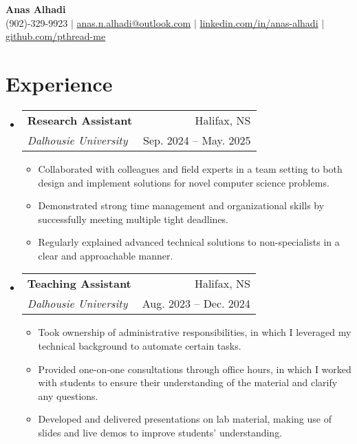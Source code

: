 \documentclass[letterpaper,11pt]{article}
\makeatletter
\newcommand{\resumeItem}[1]{
  \item\small{
    {#1 \vspace{-2pt}}
  }
}
\newcommand{\resumeSubheading}[4]{
  \vspace{-2pt}\item
    \begin{tabular*}{0.97\textwidth}[t]{l@{\extracolsep{\fill}}r}
      \textbf{#1} & #2 \\
			\textit{\small#3} & \small #4 \\
    \end{tabular*}\vspace{-7pt}
}
\newcommand{\resumeSubHeadingListStart}{\begin{itemize}[leftmargin=0.15in, label={}]}
\newcommand{\resumeSubHeadingListEnd}{\end{itemize}}
\newcommand{\resumeItemListStart}{\begin{itemize}}
\newcommand{\resumeItemListEnd}{\end{itemize}\vspace{-5pt}}
\makeatother
\begin{document}

\begin{center}
    \textbf{\Huge Anas Alhadi} \\ \vspace{1pt}
		\vspace{5pt}
		\small (902)-329-9923 $|$ \href{mailto:anas.n.alhadi@outlook.com}{anas.n.alhadi@outlook.com} $|$ 
    \href{https://linkedin.com/in/anas-alhadi}{linkedin.com/in/anas-alhadi} $|$ 
    \href{https://github.com/pthread-me}{github.com/pthread-me}
    
\end{center}




\vspace{1pt}
\section{Experience}
	\vspace{5pt}
  \resumeSubHeadingListStart
	\resumeSubheading
      {Research Assistant}{Halifax, NS}
      {Dalhousie University}{Sep. 2024 -- May. 2025}
      \resumeItemListStart
        \resumeItem{Collaborated with colleagues and field experts in a team setting to both design and implement solutions for novel computer science problems.}
        \resumeItem{Demonstrated strong time management and organizational skills by successfully meeting multiple tight deadlines.}
				\resumeItem{Regularly explained advanced technical solutions to non-specialists in a clear and approachable manner.}
			\resumeItemListEnd 


	\vspace{15pt}
	\resumeSubheading
	{Teaching Assistant}{Halifax, NS}
      {Dalhousie University}{Aug. 2023 -- Dec. 2024}
      \resumeItemListStart
				\resumeItem{Took ownership of administrative responsibilities, in which I leveraged my technical background to automate certain tasks.}
				\resumeItem{Provided one-on-one consultations through office hours, in which I worked with students to ensure their understanding of the material and clarify any questions.}
				\resumeItem{Developed and delivered presentations on lab material, making use of slides and live demos to improve students' understanding.}
			\resumeItemListEnd 
  \resumeSubHeadingListEnd
\end{document}
